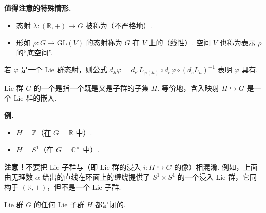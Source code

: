 \noindent\textbf{值得注意的特殊情形.}
\begin{itemize}[label=--]
\item 态射 $\lambda:(\mathbb{R},+)\longrightarrow G$ 被称为（不严格地）.
\item 形如 $\rho:G\longrightarrow\mathrm{GL}(V)$ 的态射称为 $G$ 在 $V$ 上的（线性）. 空间 $V$ 也称为表示 $\rho$ 的``底空间''.
\end{itemize}

\begin{remark}\label{rem:lie-1-1-5}
若 $\varphi$ 是一个 Lie 群态射，则公式 $d_{h}\varphi=d_{e'}L_{\varphi(h)}\circ d_{e}\varphi\circ(d_{e}L_{h})^{-1}$ 表明 $\varphi$ 具有.
\end{remark}

\begin{definition}\label{def:lie-1-1-6}
Lie 群 $G$ 的一个是指一个既是又是子群的子集 $H$. 等价地，含入映射 $H\hookrightarrow G$ 是一个 Lie 群的嵌入.
\end{definition}

\noindent\textbf{例.}
\begin{itemize}[label=--]
\item $H=\mathbb{Z}$（在 $G=\mathbb{R}$ 中）.
\item $H=S^{1}$（在 $G=\mathbb{C}^{\times}$ 中）.
\end{itemize}

\noindent\textbf{注意！}不要把 Lie 子群与（即 Lie 群的浸入 $i:H\hookrightarrow G$ 的像）相混淆. 例如，上面由无理数 $\alpha$ 给出的直线在环面上的缠绕提供了 $S^{1}\times S^{1}$ 的一个浸入 Lie 群，它同构于 $(\mathbb{R},+)$，但不是一个 Lie 子群.

\begin{proposition}\label{prop:lie-1-1-7}
Lie 群 $G$ 的任何 Lie 子群 $H$ 都是闭的.
\end{proposition}

